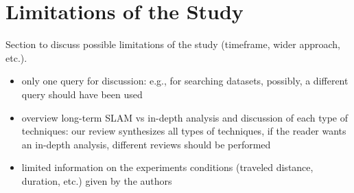 \section{Limitations of the Study}
\label{sec:limitations}

Section to discuss possible limitations of the study (timeframe, wider approach, etc.).

\begin{itemize}[nosep]
\item only one query for discussion: e.g., for searching datasets, possibly, a different query should have been used
\item overview long-term SLAM vs in-depth analysis and discussion of each type of techniques: our review synthesizes all types of techniques, if the reader wants an in-depth analysis, different reviews should be performed
\item limited information on the experiments conditions (traveled distance, duration, etc.) given by the authors
\end{itemize}

